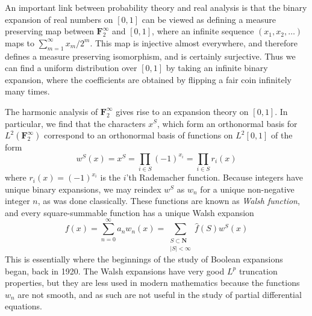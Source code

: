 An important link between probability theory and real analysis is that the binary expansion of real numbers on $[0,1]$ can be viewed as defining a measure preserving map between $\mathbf{F}_2^\infty$ and $[0,1]$, where an infinite sequence $(x_1, x_2, \dots)$ maps to $\sum_{m = 1}^\infty x_m/2^m$. This map is injective almost everywhere, and therefore defines a measure preserving isomorphism, and is certainly surjective. Thus we can find a uniform distribution over $[0,1]$ by taking an infinite binary expansion, where the coefficients are obtained by flipping a fair coin infinitely many times.

The harmonic analysis of $\mathbf{F}_2^\infty$ gives rise to an expansion theory on $[0,1]$. In particular, we find that the characters $x^S$, which form an orthonormal basis for $L^2(\mathbf{F}_2^\infty)$ correspond to an orthonormal basis of functions on $L^2[0,1]$ of the form
%
\[ w^S(x) = x^S = \prod_{i \in S} (-1)^{x_i} = \prod_{i \in S} r_i(x) \]
%
where $r_i(x) = (-1)^{x_i}$ is the $i$'th Rademacher function. Because integers have unique binary expansions, we may reindex $w^S$ as $w_n$ for a unique non-negative integer $n$, as was done classically. These functions are known as \emph{Walsh function}, and every square-summable function has a unique Walsh expansion
%
\[ f(x) = \sum_{n = 0}^\infty a_n w_n(x) = \sum_{\substack{S \subset \mathbf{N}\\ |S| < \infty}} \widehat{f}(S) w^S(x) \]
%
This is essentially where the beginnings of the study of Boolean expansions began, back in 1920. The Walsh expansions have very good $L^p$ truncation properties, but they are less used in modern mathematics because the functions $w_n$ are not smooth, and as such are not useful in the study of partial differential equations.

